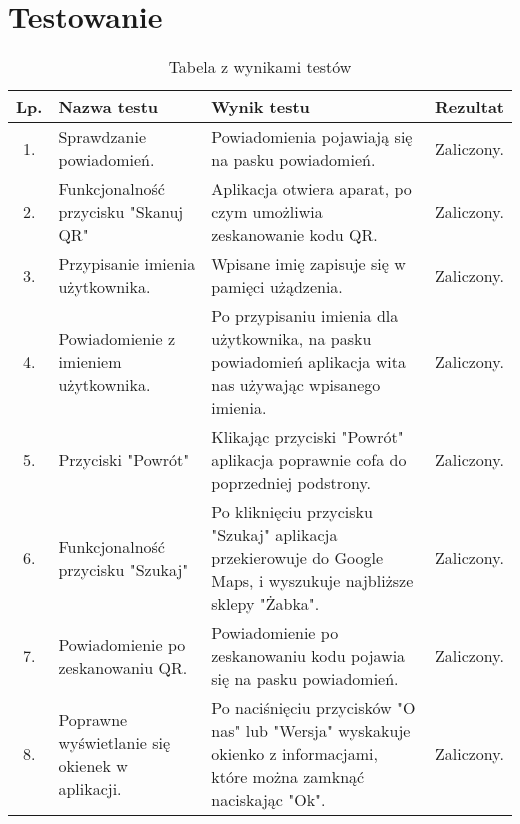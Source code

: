 	\newpage
\section{Testowanie}	%

	
	\begin{table}[ht]
		\centering
		\begin{tabular}{|c|p{5cm}|p{6cm}|p{2cm}|}
			\hline
			Lp. & Nazwa testu & Wynik testu & Rezultat \\
			\hline
			1. & Sprawdzanie powiadomień. & Powiadomienia pojawiają się na pasku powiadomień. & Zaliczony. \\ 
			\hline
			2. & Funkcjonalność przycisku "Skanuj QR" & Aplikacja otwiera aparat, po czym umożliwia zeskanowanie kodu QR. & Zaliczony. \\
			\hline
			3. & Przypisanie imienia użytkownika. & Wpisane imię zapisuje się w pamięci użądzenia. & Zaliczony. \\
			\hline
			4. & Powiadomienie z imieniem użytkownika. & Po przypisaniu imienia dla użytkownika, na pasku powiadomień aplikacja wita nas używając wpisanego imienia. & Zaliczony. \\
			\hline
			5. & Przyciski "Powrót" & Klikając przyciski "Powrót" aplikacja poprawnie cofa do poprzedniej podstrony. & Zaliczony. \\
			\hline
			6. & Funkcjonalność przycisku "Szukaj" & Po kliknięciu przycisku "Szukaj" aplikacja przekierowuje do Google Maps, i wyszukuje najbliższe sklepy "Żabka". & Zaliczony. \\
			\hline
			7. & Powiadomienie po zeskanowaniu QR. & Powiadomienie po zeskanowaniu kodu pojawia się na pasku powiadomień. & Zaliczony. \\
			\hline
			8. & Poprawne wyświetlanie się okienek w aplikacji. & Po naciśnięciu przycisków "O nas" lub "Wersja" wyskakuje okienko z informacjami, które można zamknąć naciskając "Ok". & Zaliczony. \\
			\hline
		\end{tabular}
		\caption{Tabela z wynikami testów}
		\label{tab:wyniki}
	\end{table}
	

